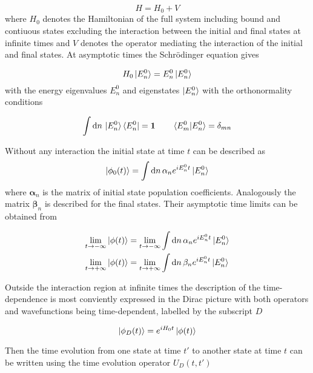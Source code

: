 \begin{equation}
  H = H_0 + V
\end{equation}
where $H_0$ denotes the Hamiltonian of the full system including
bound and contiuous states excluding the interaction
between the initial and final states at infinite times and $V$ denotes the
operator mediating the interaction of the initial and final states.
At asymptotic times the Schrödinger equation gives

\begin{equation}
 H_0 \ket{E_n^{0}} = E_n^{0} \ket{E_n^{0}}
\end{equation}
with the energy eigenvalues $E_n^{0}$ and eigenstates $\ket{E_n^{0}}$ with the
orthonormality conditions

\begin{equation}
 \int \mathrm{d}n \, \ket{E_n^{0}} \bra{E_n^{0}} = \mathbf{1} \quad\quad
 \braket{E_m^{0} |E_n^{0}} = \delta_{mn}
\end{equation}

Without any interaction the initial state at time $t$ can be described as
\begin{equation}
 \ket{\phi_0(t)} = \int \mathrm{d}n \, \mathbf{\alpha}_n e^{iE_n^0t} \ket{E_n^0}
\end{equation}
where $\mathbf{\alpha}_n$ is the matrix of initial state population coefficients.
Analogously the matrix $\mathbf{\beta}_n$ is described for the final states.
Their asymptotic time limits can be obtained from

\begin{align}
 \lim_{t \to -\infty} \ket{\phi(t)} &= \lim_{t \to -\infty}
       \int \mathrm{d}n \, \mathbf{\alpha}_n e^{iE_n^0t} \ket{E_n^0}   \\
 \lim_{t \to +\infty} \ket{\phi(t)} &= \lim_{t \to +\infty}
       \int \mathrm{d}n \, \mathbf{\beta}_n e^{iE_n^0t} \ket{E_n^0}   
\end{align}

Outside the interaction region at infinite times the description of the
time-dependence is most conviently expressed in the Dirac picture with both
operators and wavefunctions being time-dependent, labelled by the subscript $D$

\begin{equation}
 \ket{\phi_D(t)} = e^{iH_0t} \ket{\phi(t)}
\end{equation}

Then the time evolution from one state at time $t'$ to another state at time
$t$ can be written using the time evolution operator $U_D(t,t')$

